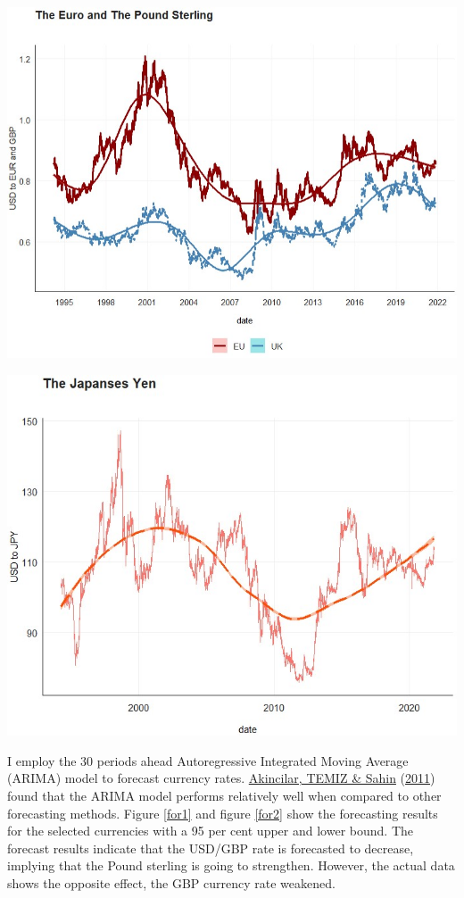 \documentclass[11pt,preprint, authoryear]{elsarticle}
\let\origfigure\figure
\let\endorigfigure\endfigure
\renewenvironment{figure}[1][2] {
    \expandafter\origfigure\expandafter[H]
} {
    \endorigfigure
}
\numberwithin{equation}{section}
\numberwithin{figure}{section}
\numberwithin{table}{section}
\begin{document}
\begin{figure}
\centering 
\begin{minipage}[t]{8.2cm} 
\centering 
 \includegraphics[width=\linewidth]{for1.jpg} 
 \end{minipage} 
 \hspace{0.1cm} 
 \begin{minipage}[t]{8.2cm} 
 \centering 
 \includegraphics[width=\linewidth]{for2.jpg} 
 \end{minipage}
\caption{The three most traded currencies}
\label{for}
\end{figure}

I employ the 30 periods ahead Autoregressive Integrated Moving Average
(ARIMA) model to forecast currency rates.
\protect\hyperlink{ref-akin}{Akincilar, TEMIZ \& Sahin}
(\protect\hyperlink{ref-akin}{2011}) found that the ARIMA model performs
relatively well when compared to other forecasting methods. Figure
\ref{for1} and figure \ref{for2} show the forecasting results for the
selected currencies with a 95 per cent upper and lower bound. The
forecast results indicate that the USD/GBP rate is forecasted to
decrease, implying that the Pound sterling is going to strengthen.
However, the actual data shows the opposite effect, the GBP currency
rate weakened.
\end{document}
